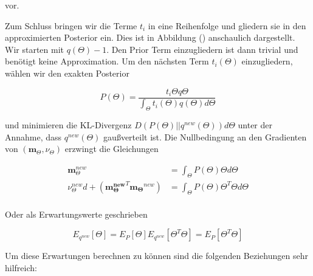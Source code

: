 \documentclass[12pt,a4paper]{scrartcl}
\numberwithin{equation}{section}
\begin{document}
{  vor. 
  
  Zum Schluss bringen wir die Terme $t_i$ in eine Reihenfolge und gliedern sie in den approximierten 
  Posterior ein. Dies ist in Abbildung () anschaulich dargestellt. Wir starten mit $q(\Theta) - 1$. Den Prior 
  Term einzugliedern ist dann trivial und benötigt keine Approximation. Um den nächsten Term $t_i(\Theta)$ einzugliedern, 
  wählen wir den exakten Posterior
  
  \begin{equation}
   P(\Theta) = \frac{t_i{\Theta}q{\Theta}}{\int_{\Theta}t_i(\Theta)q(\Theta)d \Theta}
  \end{equation}
   
  und minimieren die KL-Divergenz $D(P(\Theta)||q^{new}(\Theta)) d \Theta$ unter der Annahme, dass
  $q^{new}(\Theta)$ gaußverteilt ist. Die Nullbedingung an den Gradienten von $(\mathbf{m}_\Theta, \nu_{\Theta})$
  erzwingt die Gleichungen
  
  \begin{equation}
  \begin{split}
   \mathbf{m}_{\Theta}^{new} &= \int_{\Theta} P(\Theta) \Theta d \Theta \\
   \nu_{\Theta}^{new} d + (\mathbf{m_{\Theta}^{new}}^T \mathbf{m_{\Theta}}^{new}) &= \int_{\Theta} P(\Theta) \Theta^T \Theta d \Theta \\
  \end{split}
  \end{equation}
   
  Oder als Erwartungswerte geschrieben 
  
  \begin{equation}
   E_{q^{new}}[\Theta] = E_P[\Theta]
   E_{q^{new}}[\Theta^T \Theta] = E_{P}[\Theta^T \Theta]
  \end{equation}

  Um diese Erwartungen berechnen zu können sind die folgenden Beziehungen sehr hilfreich: 
  
}
\end{document}
